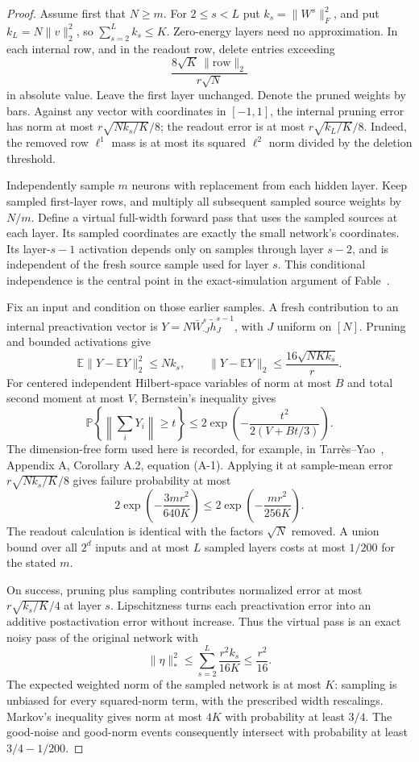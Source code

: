 \documentclass[11pt]{article}
\newcommand{\E}{\mathbb E}
\newcommand{\Pp}{\mathbb P}
\begin{document}
\begin{proof}
Assume first that $N\ge m$. For $2\le s<L$ put $k_s=\|W^s\|_F^2$,
and put $k_L=N\|v\|_2^2$, so $\sum_{s=2}^L k_s\le K$.
Zero-energy layers need no approximation. In each internal row, and in the
readout row, delete entries exceeding
\[
 \frac{8\sqrt K\,\|\text{row}\|_2}{r\sqrt N}
\]
in absolute value. Leave the first layer unchanged. Denote the pruned
weights by bars. Against any vector with coordinates in $[-1,1]$, the
internal pruning error has norm at most
$r\sqrt{Nk_s/K}/8$; the readout error is at most $r\sqrt{k_L/K}/8$.
Indeed, the removed row $\ell^1$ mass is at most its squared $\ell^2$ norm
divided by the deletion threshold.

Independently sample $m$ neurons with replacement from each hidden layer.
Keep sampled first-layer rows, and multiply all subsequent sampled source
weights by $N/m$. Define a virtual full-width forward pass that uses the
sampled sources at each layer. Its sampled coordinates are exactly the
small network's coordinates. Its layer-$s-1$ activation depends only on
samples through layer $s-2$, and is independent of the fresh source sample
used for layer $s$. This conditional independence is the central point in
the exact-simulation argument of Fable~\cite{fable}.

Fix an input and condition on those earlier samples. A fresh contribution
to an internal preactivation vector is
$Y=N\bar W^s_{\cdot J}\widetilde h^{s-1}_J$, with $J$ uniform on $[N]$.
Pruning and bounded activations give
\[
 \E\|Y-\E Y\|_2^2\le Nk_s,
 \qquad \|Y-\E Y\|_2\le\frac{16\sqrt{NKk_s}}r.
\]
For centered independent Hilbert-space variables of norm at most $B$ and
total second moment at most $V$, Bernstein's inequality gives
\[
 \Pp\!\left\{\left\|\sum_i Y_i\right\|\ge t\right\}
 \le2\exp\!\left(-\frac{t^2}{2(V+Bt/3)}\right).
\]
The dimension-free form used here is recorded, for example, in
Tarr\`es--Yao~\cite{tarres}, Appendix A, Corollary A.2, equation (A-1).
Applying it at sample-mean error
$r\sqrt{Nk_s/K}/8$ gives failure probability at most
\[
 2\exp\left(-\frac{3mr^2}{640K}\right)
 \le2\exp\left(-\frac{mr^2}{256K}\right).
\]
The readout calculation is identical with the factors $\sqrt N$ removed.
A union bound over all $2^d$ inputs and at most $L$ sampled layers costs
at most $1/200$ for the stated $m$.

On success, pruning plus sampling contributes normalized error at most
$r\sqrt{k_s/K}/4$ at layer $s$. Lipschitzness turns each preactivation
error into an additive postactivation error without increase. Thus the
virtual pass is an exact noisy pass of the original network with
\[
 \|\eta\|_*^2\le\sum_{s=2}^L\frac{r^2k_s}{16K}\le\frac{r^2}{16}.
\]
The expected weighted norm of the sampled network is at most $K$:
sampling is unbiased for every squared-norm term, with the prescribed
width rescalings. Markov's inequality gives norm at most $4K$ with
probability at least $3/4$. The good-noise and good-norm events consequently
intersect with probability at least $3/4-1/200$.


\end{proof}
\end{document}

